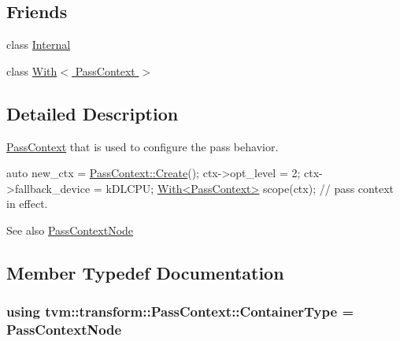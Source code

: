 \subsection*{Friends}
\begin{DoxyCompactItemize}
\item 
class \hyperlink{classtvm_1_1transform_1_1PassContext_a8bde6eb35df6b3a9f53810e0bc79fdfd}{Internal}
\item 
class \hyperlink{classtvm_1_1transform_1_1PassContext_a5f399608a6da56a5c91ea6ead8489f69}{With$<$ Pass\+Context $>$}
\end{DoxyCompactItemize}


\subsection{Detailed Description}
\hyperlink{classtvm_1_1transform_1_1PassContext}{Pass\+Context} that is used to configure the pass behavior. 


\begin{DoxyCode}
\textcolor{keyword}{auto} new\_ctx = \hyperlink{classtvm_1_1transform_1_1PassContext_aabfad8965c2f4e7b6e4b0812652ddfd2}{PassContext::Create}();
ctx->opt\_level = 2;
ctx->fallback\_device = kDLCPU;
\hyperlink{classtvm_1_1transform_1_1PassContext_a5f399608a6da56a5c91ea6ead8489f69}{With<PassContext>} scope(ctx);
\textcolor{comment}{// pass context in effect.}
\end{DoxyCode}
 \begin{DoxySeeAlso}{See also}
\hyperlink{classtvm_1_1transform_1_1PassContextNode}{Pass\+Context\+Node} 
\end{DoxySeeAlso}


\subsection{Member Typedef Documentation}
\subsubsection[{\texorpdfstring{Container\+Type}{ContainerType}}]{\setlength{\rightskip}{0pt plus 5cm}using {\bf tvm\+::transform\+::\+Pass\+Context\+::\+Container\+Type} =  {\bf Pass\+Context\+Node}}\hypertarget{classtvm_1_1transform_1_1PassContext_aacc7ca51bec83db2784d871bb324ce93}{}\label{classtvm_1_1transform_1_1PassContext_aacc7ca51bec83db2784d871bb324ce93}


